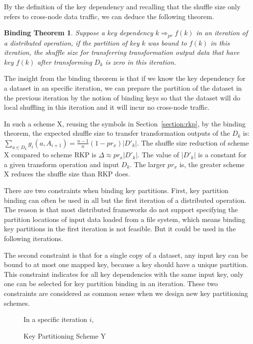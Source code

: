 \documentclass[10pt,journal,compsoc]{IEEEtran}
\makeatletter
\newcommand{\removelatexerror}{\let\@latex@error\@gobble}
\makeatother
\begin{document}
By the definition of the key dependency and recalling that 
the shuffle size only refers to cross-node data traffic,
we can deduce the following theorem.
\newtheorem*{theorem*}{\textbf{Binding Theorem}}
\begin{theorem*}\label{thm:binding}
Suppose a key dependency $k \Rightarrow_{pr} f(k)$ in an iteration of a distributed operation,
if the partition of key $k$ was bound to $f(k)$ in this iteration, 
the shuffle size for transferring transformation output data that have key $f(k)$ after transforming $D_k$ is zero in this iteration.
\end{theorem*}

The insight from the binding theorem is that if we know the key dependency
for a dataset in an specific iteration, we can prepare the partition
of the dataset in the previous iteration by the notion of binding keys so that the dataset
will do local shuffling in this iteration and it will incur no cross-node traffic. 

In such a scheme X, reusing the symbols in Section~\ref{section:rkp}, 
by the binding theorem, the expected shuffle size to transfer 
transformation outputs of the $D_k$ is: $\sum_{a \in D_k} g_i(a, A_{i+1}) = \frac{n-1}{n} (1 - pr_x) |D'_{k}|$.
The shuffle size reduction of scheme X compared to scheme RKP is 
$ \Delta \approx pr_x |D'_{k}|$. 
The value of $|D'_{k}|$ is a constant for a given transform operation and input $D_k$. 
The larger $pr_x$ is, the greater scheme X reduces the shuffle size than RKP does. 

There are two constraints when binding key partitions. 
First, key partition binding can often be used in all but the first iteration of a distributed operation.
The reason is that most distributed frameworks do not support specifying the partition locations of input data loaded from a file system, which means 
binding key partitions in the first iteration is not feasible. 
But it could be used in the following iterations.

The second constraint is that for a single copy of a dataset, any input key can be bound to at most one mapped 
key, because a key should have a unique partition. 
This constraint indicates for all key dependencies with the same input key, only one can be selected for key partition binding in an iteration. 
These two constraints are considered as common sense when we design new key partitioning schemes.

\begin{figure}[!t]
\removelatexerror

\begin{algorithm}[H]
  In a specific iteration $i$,

\caption{Key Partitioning Scheme Y}
\label{algo:y}
\end{algorithm}
\end{figure}
\end{document}
